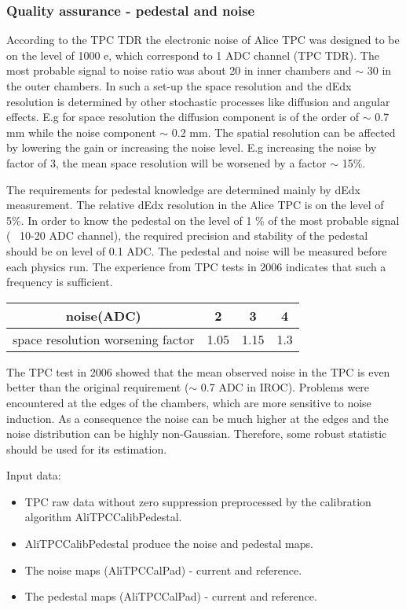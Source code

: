 \documentclass[a4paper,12pt]{article}
\begin{document}
\subsubsection{Quality  assurance  - pedestal and noise}

According to the TPC TDR the electronic noise of Alice TPC was designed to be on 
the level of 1000 e, which correspond to 1 ADC channel (TPC TDR). The most probable
signal to noise ratio was about 20 in inner chambers and $\sim$ 30 in the outer
chambers. In such a set-up the space resolution and the dEdx  resolution is 
determined by other stochastic processes like diffusion and angular effects. 
E.g for space resolution the diffusion component is of the order of $\sim$ 0.7 mm 
while the noise component $\sim$ 0.2 mm. The spatial resolution can be affected by 
lowering the gain or increasing the noise level. E.g increasing the noise by 
factor of 3,  the mean space resolution will be worsened by a factor $\sim$ 15\%. 

The requirements for pedestal knowledge are determined mainly by dEdx 
measurement. The relative dEdx resolution in the Alice TPC is on the level of 5\%. 
In order to know the pedestal on the level of 1 \% of the 
most probable signal (~ 10-20 ADC channel), the required precision and stability
of the pedestal should be on level of 0.1 ADC. The pedestal and noise will be 
measured before each physics run. The experience from TPC tests in 2006 
indicates that such a frequency is sufficient.

\begin{table}
\begin{tabular}{|l|r|r|r|} \hline
  \multicolumn{1}{|c|}{noise(ADC)} & \multicolumn{1}{|c|}{2} &
  \multicolumn{1}{|c|}{3}& \multicolumn{1}{|c|}{4} \\ \hline
space resolution worsening factor &  1.05 & 1.15 & 1.3 \\ \hline
\end{tabular}
\end{table}
         
The TPC test in 2006 showed that the mean observed  noise in the TPC is even 
better than the original requirement ($\sim$ 0.7 ADC in IROC).  Problems were encountered 
at the edges of the chambers, which are more sensitive to noise induction. 
As a consequence the noise can be much higher at the edges and the noise 
distribution can be highly non-Gaussian.  Therefore, some robust statistic 
should be used for its estimation.

Input data:
\begin{itemize}
 \item TPC raw data without zero suppression preprocessed by the calibration 
      algorithm AliTPCCalibPedestal.
 \item AliTPCCalibPedestal produce the noise and pedestal maps.
 \item The noise maps (AliTPCCalPad)  - current and reference.
 \item The pedestal maps (AliTPCCalPad) - current and reference.
\end{itemize}
\end{document}
